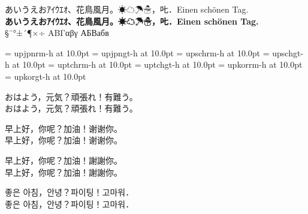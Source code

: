 \documentclass{ujarticle}
\begin{document}
\parindent0mm
\pagestyle{empty}
あいうえおｱｲｳｴｵ、花鳥風月。☀☁☂☃，𠮟．Einen schönen Tag.\\
{\bfseries あいうえおｱｲｳｴｵ、花鳥風月。☀☁☂☃，𠮟．Einen schönen Tag.}\\
§¨°±´¶×÷ ΑΒΓαβγ АБВабв

\font\upjpnrmm = upjpnrm-h at 10.0pt
\font\upjpngtm = upjpngt-h at 10.0pt
\font\upschrmm = upschrm-h at 10.0pt
\font\upschgtm = upschgt-h at 10.0pt
\font\uptchrmm = uptchrm-h at 10.0pt
\font\uptchgtm = uptchgt-h at 10.0pt
\font\upkorrmm = upkorrm-h at 10.0pt
\font\upkorgtm = upkorgt-h at 10.0pt

\upjpnrmm おはよう，元気？頑張れ！有難う。\\
\upjpngtm おはよう，元気？頑張れ！有難う。

\upschrmm 早上好，你呢？加油！谢谢你。\\
\upschgtm 早上好，你呢？加油！谢谢你。

\uptchrmm 早上好，你呢？加油！謝謝你。\\
\uptchgtm 早上好，你呢？加油！謝謝你。

\upkorrmm 좋은 아침，안녕？파이팅！고마워．\\
\upkorgtm 좋은 아침，안녕？파이팅！고마워．
\end{document}
